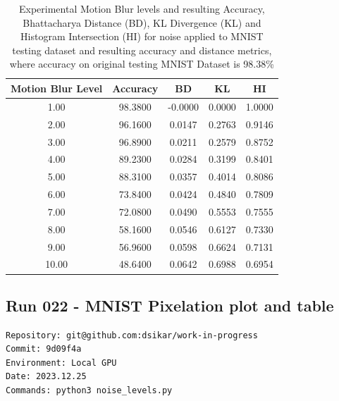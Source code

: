 \begin{table}[ht]
\centering
\begin{tabular}{|c|c|c|c|c|}
\hline
Motion Blur Level & Accuracy & BD & KL & HI \\
\hline
1.00 & 98.3800 & -0.0000 & 0.0000 & 1.0000 \\
2.00 & 96.1600 & 0.0147 & 0.2763 & 0.9146 \\
3.00 & 96.8900 & 0.0211 & 0.2579 & 0.8752 \\
4.00 & 89.2300 & 0.0284 & 0.3199 & 0.8401 \\
5.00 & 88.3100 & 0.0357 & 0.4014 & 0.8086 \\
6.00 & 73.8400 & 0.0424 & 0.4840 & 0.7809 \\
7.00 & 72.0800 & 0.0490 & 0.5553 & 0.7555 \\
8.00 & 58.1600 & 0.0546 & 0.6127 & 0.7330 \\
9.00 & 56.9600 & 0.0598 & 0.6624 & 0.7131 \\
10.00 & 48.6400 & 0.0642 & 0.6988 & 0.6954 \\
\hline
\end{tabular}
\caption{Experimental Motion Blur levels and resulting Accuracy, Bhattacharya Distance (BD), KL Divergence (KL) and Histogram Intersection (HI) for noise applied to MNIST testing dataset and resulting accuracy and distance metrics, where accuracy on original testing MNIST Dataset is 98.38\%}
\label{tbl-impulse-noise-levels}
\end{table}

\subsection{Run 022 - MNIST Pixelation plot and table}
\label{app_res:022}
\begin{verbatim}
Repository: git@github.com:dsikar/work-in-progress
Commit: 9d09f4a
Environment: Local GPU
Date: 2023.12.25
Commands: python3 noise_levels.py
\end{verbatim}

